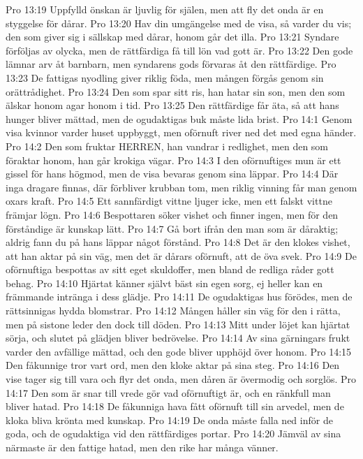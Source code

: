 Pro 13:19  Uppfylld önskan är ljuvlig för själen, men att fly det onda är en styggelse för dårar.
Pro 13:20  Hav din umgängelse med de visa, så varder du vis; den som giver sig i sällskap med dårar, honom går det illa.
Pro 13:21  Syndare förföljas av olycka, men de rättfärdiga få till lön vad gott är.
Pro 13:22  Den gode lämnar arv åt barnbarn, men syndarens gods förvaras åt den rättfärdige.
Pro 13:23  De fattigas nyodling giver riklig föda, men mången förgås genom sin orättrådighet.
Pro 13:24  Den som spar sitt ris, han hatar sin son, men den som älskar honom agar honom i tid.
Pro 13:25  Den rättfärdige får äta, så att hans hunger bliver mättad, men de ogudaktigas buk måste lida brist.
Pro 14:1  Genom visa kvinnor varder huset uppbyggt, men oförnuft river ned det med egna händer.
Pro 14:2  Den som fruktar HERREN, han vandrar i redlighet, men den som föraktar honom, han går krokiga vägar.
Pro 14:3  I den oförnuftiges mun är ett gissel för hans högmod, men de visa bevaras genom sina läppar.
Pro 14:4  Där inga dragare finnas, där förbliver krubban tom, men riklig vinning får man genom oxars kraft.
Pro 14:5  Ett sannfärdigt vittne ljuger icke, men ett falskt vittne främjar lögn.
Pro 14:6  Bespottaren söker vishet och finner ingen, men för den förståndige är kunskap lätt.
Pro 14:7  Gå bort ifrån den man som är dåraktig; aldrig fann du på hans läppar något förstånd.
Pro 14:8  Det är den klokes vishet, att han aktar på sin väg, men det är dårars oförnuft, att de öva svek.
Pro 14:9  De oförnuftiga bespottas av sitt eget skuldoffer, men bland de redliga råder gott behag.
Pro 14:10  Hjärtat känner självt bäst sin egen sorg, ej heller kan en främmande intränga i dess glädje.
Pro 14:11  De ogudaktigas hus förödes, men de rättsinnigas hydda blomstrar.
Pro 14:12  Mången håller sin väg för den i rätta, men på sistone leder den dock till döden.
Pro 14:13  Mitt under löjet kan hjärtat sörja, och slutet på glädjen bliver bedrövelse.
Pro 14:14  Av sina gärningars frukt varder den avfällige mättad, och den gode bliver upphöjd över honom.
Pro 14:15  Den fåkunnige tror vart ord, men den kloke aktar på sina steg.
Pro 14:16  Den vise tager sig till vara och flyr det onda, men dåren är övermodig och sorglös.
Pro 14:17  Den som är snar till vrede gör vad oförnuftigt är, och en ränkfull man bliver hatad.
Pro 14:18  De fåkunniga hava fått oförnuft till sin arvedel, men de kloka bliva krönta med kunskap.
Pro 14:19  De onda måste falla ned inför de goda, och de ogudaktiga vid den rättfärdiges portar.
Pro 14:20  Jämväl av sina närmaste är den fattige hatad, men den rike har många vänner.
